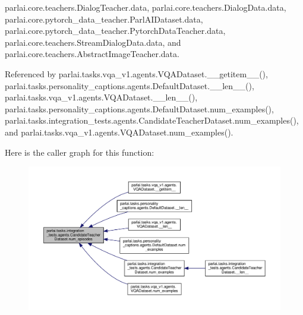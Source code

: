 parlai.\+core.\+teachers.\+Dialog\+Teacher.\+data, parlai.\+core.\+teachers.\+Dialog\+Data.\+data, parlai.\+core.\+pytorch\+\_\+data\+\_\+teacher.\+Parl\+A\+I\+Dataset.\+data, parlai.\+core.\+pytorch\+\_\+data\+\_\+teacher.\+Pytorch\+Data\+Teacher.\+data, parlai.\+core.\+teachers.\+Stream\+Dialog\+Data.\+data, and parlai.\+core.\+teachers.\+Abstract\+Image\+Teacher.\+data.



Referenced by parlai.\+tasks.\+vqa\+\_\+v1.\+agents.\+V\+Q\+A\+Dataset.\+\_\+\+\_\+getitem\+\_\+\+\_\+(), parlai.\+tasks.\+personality\+\_\+captions.\+agents.\+Default\+Dataset.\+\_\+\+\_\+len\+\_\+\+\_\+(), parlai.\+tasks.\+vqa\+\_\+v1.\+agents.\+V\+Q\+A\+Dataset.\+\_\+\+\_\+len\+\_\+\+\_\+(), parlai.\+tasks.\+personality\+\_\+captions.\+agents.\+Default\+Dataset.\+num\+\_\+examples(), parlai.\+tasks.\+integration\+\_\+tests.\+agents.\+Candidate\+Teacher\+Dataset.\+num\+\_\+examples(), and parlai.\+tasks.\+vqa\+\_\+v1.\+agents.\+V\+Q\+A\+Dataset.\+num\+\_\+examples().

Here is the caller graph for this function\+:
\nopagebreak
\begin{figure}[H]
\begin{center}
\leavevmode
\includegraphics[width=350pt]{classparlai_1_1tasks_1_1integration__tests_1_1agents_1_1CandidateTeacherDataset_a8a3d8af8f189066f56bf5ae1848389c3_icgraph}
\end{center}
\end{figure}
\mbox{\label{classparlai_1_1tasks_1_1integration__tests_1_1agents_1_1CandidateTeacherDataset_a860cabd1611cbd98c2154d35a119895d}} 
